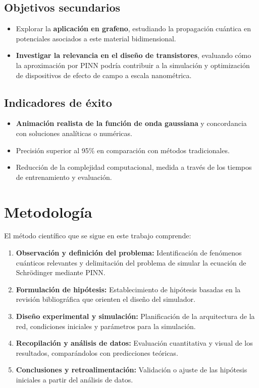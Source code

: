 \documentclass[12pt,a4paper]{article}
\begin{document}
	\subsection{Objetivos secundarios}
	\begin{itemize}
		\item Explorar la \textbf{aplicación en grafeno}, estudiando la propagación cuántica en potenciales asociados a este material bidimensional.
		\item \textbf{Investigar la relevancia en el diseño de transistores}, evaluando cómo la aproximación por PINN podría contribuir a la simulación y optimización de dispositivos de efecto de campo a escala nanométrica.
	\end{itemize}
	
	\subsection{Indicadores de éxito}
	\begin{itemize}
		\item \textbf{Animación realista de la función de onda gaussiana} y concordancia con soluciones analíticas o numéricas.
		\item Precisión superior al 95\% en comparación con métodos tradicionales.
		\item Reducción de la complejidad computacional, medida a través de los tiempos de entrenamiento y evaluación.
	\end{itemize}
	
	\section{Metodología}
	El método científico que se sigue en este trabajo comprende:
	
	\begin{enumerate}
		\item \textbf{Observación y definición del problema:} Identificación de fenómenos cuánticos relevantes y delimitación del problema de simular la ecuación de Schrödinger mediante PINN.
		\item \textbf{Formulación de hipótesis:} Establecimiento de hipótesis basadas en la revisión bibliográfica que orienten el diseño del simulador.
		\item \textbf{Diseño experimental y simulación:} Planificación de la arquitectura de la red, condiciones iniciales y parámetros para la simulación.
		\item \textbf{Recopilación y análisis de datos:} Evaluación cuantitativa y visual de los resultados, comparándolos con predicciones teóricas.
		\item \textbf{Conclusiones y retroalimentación:} Validación o ajuste de las hipótesis iniciales a partir del análisis de datos.
	\end{enumerate}
	
\end{document}
